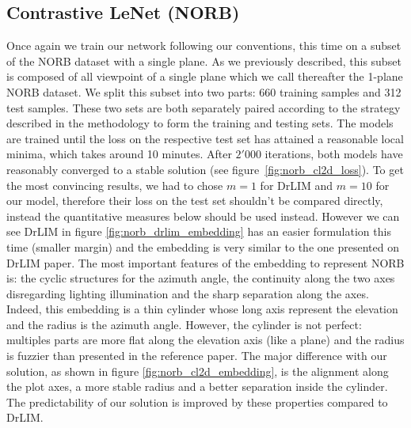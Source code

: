 \documentclass[a4paper,12pt]{report}
\begin{document}
\subsection{Contrastive LeNet (NORB)}
Once again we train our network following our conventions, this time on a subset of the NORB dataset with a single plane.
As we previously described, this subset is composed of all viewpoint of a single plane which we call thereafter the 1-plane NORB dataset.
We split this subset into two parts: 660 training samples and 312 test samples.
These two sets are both separately paired according to the strategy described in the methodology to form the training and testing sets.
The models are trained until the loss on the respective test set has attained a reasonable local minima, which takes around 10 minutes.
After $2'000$ iterations, both models have reasonably converged to a stable solution (see figure~\ref{fig:norb_cl2d_loss}).
To get the most convincing results, we had to chose $m=1$ for DrLIM and $m=10$ for our model, therefore their loss on the test set shouldn't be compared directly, instead the quantitative measures below should be used instead.
However we can see DrLIM in figure \ref{fig:norb_drlim_embedding} has an easier formulation this time (smaller margin) and the embedding is very similar to the one presented on DrLIM paper.
The most important features of the embedding to represent NORB is: the cyclic structures for the azimuth angle, the continuity along the two axes disregarding lighting illumination and the sharp separation along the axes.
Indeed, this embedding is a thin cylinder whose long axis represent the elevation and the radius is the azimuth angle.
However, the cylinder is not perfect: multiples parts are more flat along the elevation axis (like a plane) and the radius is fuzzier than presented in the reference paper.
The major difference with our solution, as shown in figure \ref{fig:norb_cl2d_embedding}, is the alignment along the plot axes, a more stable radius and a better separation inside the cylinder.
The predictability of our solution is improved by these properties compared to DrLIM.
\end{document}
